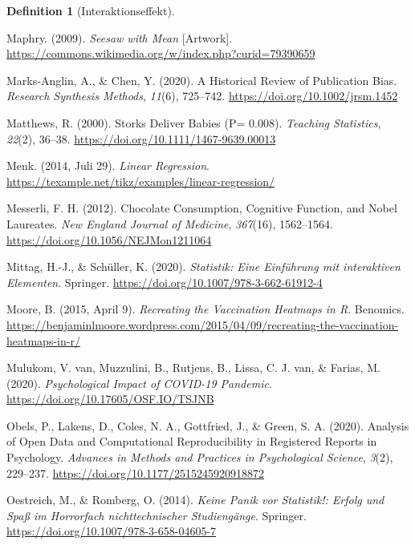 \documentclass[
  letterpaper,
]{scrbook}
\newlength{\cslhangindent}
\newenvironment{CSLReferences}[2] %
 {\begin{list}{}{%
  \setlength{\itemindent}{0pt}
  \setlength{\leftmargin}{0pt}
  \setlength{\parsep}{0pt}
  \ifodd #1
   \setlength{\leftmargin}{\cslhangindent}
   \setlength{\itemindent}{-1\cslhangindent}
  \fi
  \setlength{\itemsep}{#2\baselineskip}}}
 {\end{list}}
\theoremstyle{definition}
\theoremstyle{definition}
\theoremstyle{definition}
\newtheorem{definition}{Definition}[chapter]
\theoremstyle{remark}
\begin{document}
\begin{definition}[Interaktionseffekt]
\begin{CSLReferences}{1}{0}
Maphry. (2009). \emph{Seesaw with Mean} {[}Artwork{]}.
\url{https://commons.wikimedia.org/w/index.php?curid=79390659}

Marks‐Anglin, A., \& Chen, Y. (2020). A Historical Review of Publication
Bias. \emph{Research Synthesis Methods}, \emph{11}(6), 725--742.
\url{https://doi.org/10.1002/jrsm.1452}

Matthews, R. (2000). Storks {Deliver Babies} (P= 0.008). \emph{Teaching
Statistics}, \emph{22}(2), 36--38.
\url{https://doi.org/10.1111/1467-9639.00013}

Menk. (2014, Juli 29). \emph{Linear Regression}.
\url{https://texample.net/tikz/examples/linear-regression/}

Messerli, F. H. (2012). Chocolate {Consumption}, {Cognitive Function},
and {Nobel Laureates}. \emph{New England Journal of Medicine},
\emph{367}(16), 1562--1564. \url{https://doi.org/10.1056/NEJMon1211064}

Mittag, H.-J., \& Schüller, K. (2020). \emph{Statistik: Eine Einführung
mit interaktiven Elementen}. Springer.
\url{https://doi.org/10.1007/978-3-662-61912-4}

Moore, B. (2015, April 9). \emph{Recreating the Vaccination Heatmaps in
{R}}. Benomics.
\url{https://benjaminlmoore.wordpress.com/2015/04/09/recreating-the-vaccination-heatmaps-in-r/}

Mulukom, V. van, Muzzulini, B., Rutjens, B., Lissa, C. J. van, \&
Farias, M. (2020). \emph{Psychological Impact of {COVID-19} Pandemic}.
\url{https://doi.org/10.17605/OSF.IO/TSJNB}

Obels, P., Lakens, D., Coles, N. A., Gottfried, J., \& Green, S. A.
(2020). Analysis of {Open Data} and {Computational Reproducibility} in
{Registered Reports} in {Psychology}. \emph{Advances in Methods and
Practices in Psychological Science}, \emph{3}(2), 229--237.
\url{https://doi.org/10.1177/2515245920918872}

Oestreich, M., \& Romberg, O. (2014). \emph{Keine Panik vor Statistik!:
Erfolg und Spaß im Horrorfach nichttechnischer Studiengänge}. Springer.
\url{https://doi.org/10.1007/978-3-658-04605-7}


\end{CSLReferences}
\end{definition}
\end{document}
